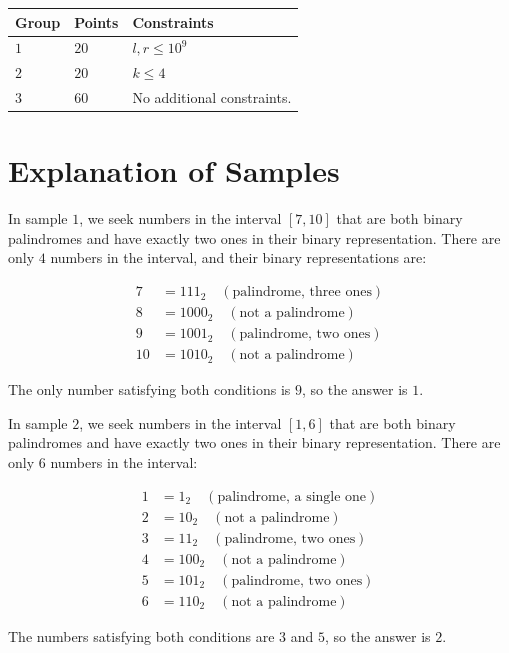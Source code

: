 \noindent
\begin{tabular}{| l | l | p{12cm} |}
  \hline
  \textbf{Group} & \textbf{Points} & \textbf{Constraints} \\ \hline
  $1$    & $20$       & $l,r \leq 10^9$ \\ \hline
  $2$    & $20$       & $k \leq 4$ \\ \hline
  $3$    & $60$       & No additional constraints. \\ \hline
\end{tabular}

\section*{Explanation of Samples}
In sample $1$, we seek numbers in the interval $[7, 10]$ that are both binary palindromes and have exactly two ones in their binary representation.
There are only $4$ numbers in the interval, and their binary representations are:

\begin{align*}
7 &= 111_2 \quad (\text{palindrome, three ones}) \\
8 &= 1000_2 \quad (\text{not a palindrome}) \\
9 &= 1001_2 \quad (\text{palindrome, two ones}) \\
10 &= 1010_2 \quad (\text{not a palindrome})
\end{align*}

The only number satisfying both conditions is $9$, so the answer is $1$.

In sample $2$, we seek numbers in the interval $[1, 6]$ that are both binary palindromes and have exactly two ones in their binary representation.
There are only $6$ numbers in the interval:

\begin{align*}
1 &= 1_2 \quad (\text{palindrome, a single one}) \\
2 &= 10_2 \quad (\text{not a palindrome}) \\
3 &= 11_2 \quad (\text{palindrome, two ones}) \\
4 &= 100_2 \quad (\text{not a palindrome}) \\
5 &= 101_2 \quad (\text{palindrome, two ones}) \\
6 &= 110_2 \quad (\text{not a palindrome})
\end{align*}

The numbers satisfying both conditions are $3$ and $5$, so the answer is $2$.
